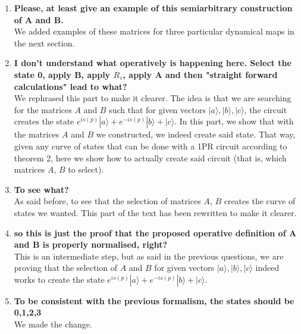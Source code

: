 \documentclass[10pt,letterpaper]{article} %
\begin{document}
\begin{enumerate}
\item  \textbf{Please, at least give an example of this semiarbitrary construction of A and B.}\\

We added examples of these matrices for three particular dynamical maps in the next section. \\

\item \textbf{I don't understand what operatively is happening here. Select the state 0, apply B, apply $R_s$, apply A and then "straight forward calculations" lead to what?} \\

We rephrased this part to make it clearer. The idea is that we are searching for the matrices $A$ and $B$ such
that for given vectors $|a\rangle, |b\rangle, |c\rangle$, the circuit creates
the state $e^{is(p)} |a \rangle + e^{-is(p)} |b \rangle + |c\rangle$.
In this part, we show that with the matrices $A$ and $B$ we constructed,
we indeed create said state.
That way, given any curve of states that can be done with a 1PR circuit
according to theorem 2, here we show how
to actually create said circuit (that is, which matrices $A$, $B$ to select).\\

\item \textbf{To see what?} \\

As said before, to see that the selection of matrices $A$, $B$ creates 
the curve of states we wanted.
This part of the text has been rewritten to make it clearer.\\


\item \textbf{so this is just the proof that the proposed operative definition of A and B is properly normalised, right?} \\

This is an intermediate step, but as said in the previous questions, 
we are proving that the selection of $A$ and $B$ for given vectors $|a\rangle, |b\rangle, |c\rangle$ 
indeed works to create the state
$e^{is(p)} |a \rangle + e^{-is(p)} |b \rangle + |c\rangle$.\\

\item \textbf{To be consistent with the previous formalism, the states should be 0,1,2,3}\\

We made the change.\\


\end{enumerate}
\end{document}

